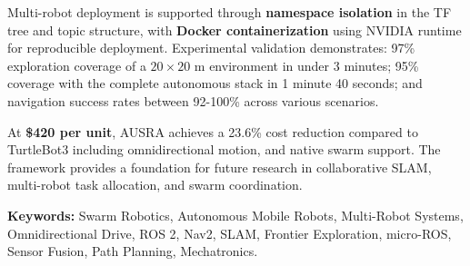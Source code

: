 Multi-robot deployment is supported through \textbf{namespace isolation} in the TF tree and topic structure, with \textbf{Docker containerization} using NVIDIA runtime for reproducible deployment. Experimental validation demonstrates: 97\% exploration coverage of a $20 \times 20$ m environment in under 3 minutes; 95\% coverage with the complete autonomous stack in 1 minute 40 seconds; and navigation success rates between 92-100\% across various scenarios.

At \textbf{\$420 per unit}, AUSRA achieves a 23.6\% cost reduction compared to TurtleBot3  including omnidirectional motion, and native swarm support. The framework provides a foundation for future research in collaborative SLAM, multi-robot task allocation, and swarm coordination.

\vspace{0.4cm}
\textbf{Keywords:} Swarm Robotics, Autonomous Mobile Robots, Multi-Robot Systems, Omnidirectional Drive, ROS 2, Nav2, SLAM, Frontier Exploration, micro-ROS, Sensor Fusion, Path Planning, Mechatronics.
